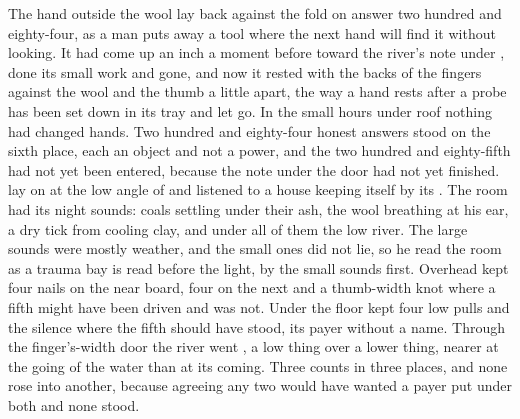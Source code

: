 
The hand outside the wool lay back against the fold on answer two hundred and eighty-four, as a man puts away a tool where the next hand will find it without looking. It had come up an inch a moment before toward the river's note under , done its small work and gone, and now it rested with the backs of the fingers against the wool and the thumb a little apart, the way a hand rests after a probe has been set down in its tray and let go. In the small hours under  roof nothing had changed hands. Two hundred and eighty-four honest answers stood on the sixth place, each an object and not a power, and the two hundred and eighty-fifth had not yet been entered, because the note under the door had not yet finished.  lay on  at the low angle of  and listened to a house keeping itself by its . The room had its night sounds: coals settling under their ash, the wool breathing at his ear, a dry tick from cooling clay, and under all of them the low river. The large sounds were mostly weather, and the small ones did not lie, so he read the room as a trauma bay is read before the light, by the small sounds first. Overhead  kept four nails on the near board, four on the next and a thumb-width knot where a fifth might have been driven and was not. Under the floor  kept four low pulls and the silence where the fifth should have stood, its payer without a name. Through the finger's-width door the river went , a low thing over a lower thing, nearer at the going of the water than at its coming. Three counts in three places, and none rose into another, because agreeing any two would have wanted a payer put under both and none stood.

